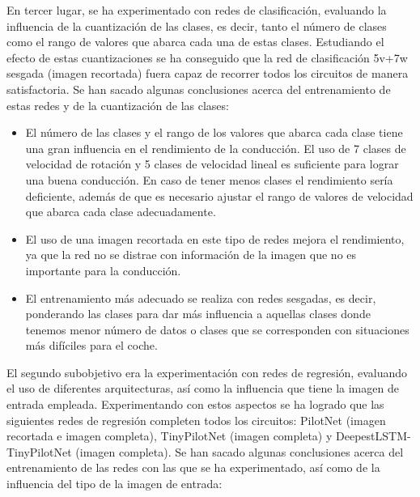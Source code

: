 En tercer lugar, se ha experimentado con redes de clasificación, evaluando la influencia de la cuantización de las clases, es decir, tanto el número de clases como el rango de valores que abarca cada una de estas clases. Estudiando el efecto de estas cuantizaciones se ha conseguido que la red de clasificación 5v+7w sesgada (imagen recortada) fuera capaz de recorrer todos los circuitos de manera satisfactoria. Se han sacado algunas conclusiones acerca del entrenamiento de estas redes y de la cuantización de las clases:\\

\begin{itemize}
    \item El número de las clases y el rango de los valores que abarca cada clase tiene una gran influencia en el rendimiento de la conducción. El uso de 7 clases de velocidad de rotación y 5 clases de velocidad lineal es suficiente para lograr una buena conducción. En caso de tener menos clases el rendimiento sería deficiente, además de que es necesario ajustar el rango de valores de velocidad que abarca cada clase adecuadamente.
    
    \item El uso de una imagen recortada en este tipo de redes mejora el rendimiento, ya que la red no se distrae con información de la imagen que no es importante para la conducción.
    
    \item El entrenamiento más adecuado se realiza con redes sesgadas, es decir, ponderando las clases para dar más influencia a aquellas clases donde tenemos menor número de datos o clases que se corresponden con situaciones más difíciles para el coche.
\end{itemize}

El segundo subobjetivo era la experimentación con redes de regresión, evaluando el uso de diferentes arquitecturas, así como la influencia que tiene la imagen de entrada empleada. Experimentando con estos aspectos se ha logrado que las siguientes redes de regresión completen todos los circuitos: PilotNet (imagen recortada e imagen completa), TinyPilotNet (imagen completa) y DeepestLSTM-TinyPilotNet (imagen completa). Se han sacado algunas conclusiones acerca del entrenamiento de las redes con las que se ha experimentado, así como de la influencia del tipo de la imagen de entrada:\\

